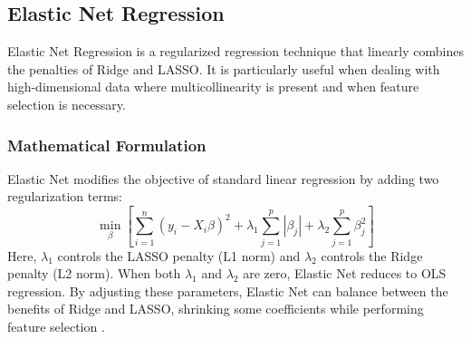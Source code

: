 \documentclass[english,11pt,a4paper,titlepage]{article}
\begin{document}
	\subsection*{Elastic Net Regression}
	Elastic Net Regression is a regularized regression technique that linearly combines the penalties of Ridge and LASSO. It is particularly useful when dealing with high-dimensional data where multicollinearity is present and when feature selection is necessary.
	
	\subsubsection*{Mathematical Formulation}
	Elastic Net modifies the objective of standard linear regression by adding two regularization terms:
	\begin{equation*}
		\min_\beta \left[\sum_{i=1}^{n}(y_i - X_i\beta)^2 + \lambda_1 \sum_{j=1}^{p}|\beta_{j}| + \lambda_2 \sum_{j=1}^{p}\beta_{j}^{2}\right]
	\end{equation*}
	Here, $\lambda_1$ controls the LASSO penalty (L1 norm) and $\lambda_2$ controls the Ridge penalty (L2 norm). When both $\lambda_1$ and $\lambda_2$ are zero, Elastic Net reduces to OLS regression. By adjusting these parameters, Elastic Net can balance between the benefits of Ridge and LASSO, shrinking some coefficients while performing feature selection \cite{zouRegularizationVariableSelection2005}.
	
\end{document}
